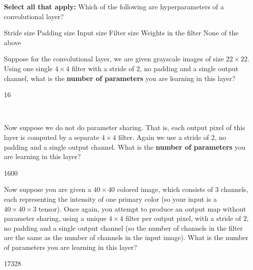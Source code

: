\documentclass[11pt,addpoints,answers]{exam}
\newcommand{\sall}{\textbf{Select all that apply: }}
\begin{document}
\begin{questions}
\begin{parts}
\begin{subparts}
    \vspace{4mm}
    
    \subpart[1] \sall Which of the following are hyperparameters of a convolutional layer?
    \checkboxchar{$\Box$} \checkedchar{$\blacksquare$}
    \begin{checkboxes}
        \CorrectChoice Stride size
        \CorrectChoice Padding size
        \CorrectChoice Input size
        \CorrectChoice Filter size
        \choice Weights in the filter
        \choice None of the above
    \end{checkboxes}
    
    \vspace{4mm}

    \subpart[1] Suppose for the convolutional layer, we are given grayscale images of size $22\times 22$. Using one single $4 \times 4$ filter with a stride of $2$, no padding and a single output channel, what is the \textbf{number of parameters} you are learning in this layer? \\
    \begin{your_solution}[height=2cm,width=4cm]
        16
    \end{your_solution}\\
    
    \vspace{4mm}
    
    \subpart[1] Now suppose we do not do parameter sharing. That is, each output pixel of this layer is computed by a separate $4 \times 4$ filter. Again we use a stride of $2$, no padding and a single output channel. What is the \textbf{number of parameters} you are learning in this layer? \\
    \begin{your_solution}[height=2cm,width=4cm]
        1600
    \end{your_solution}

    \newpage
    
    \subpart[1] Now suppose you are given a $40 \times 40$ colored image, which consists of $3$ channels, each representing the intensity of one primary color (so your input is a $40 \times 40 \times 3$ tensor). Once again, you attempt to produce an output map without parameter sharing, using a unique $4 \times 4$ filter per output pixel, with a stride of $2$, no padding and a single output channel (so the number of channels in the filter are the same as the number of channels in the input image). What is the number of parameters you are learning in this layer? \\
    \begin{your_solution}[height=2cm,width=4cm]
        17328
    \end{your_solution}\\


\end{subparts}
\end{parts}
\end{questions}
\end{document}
